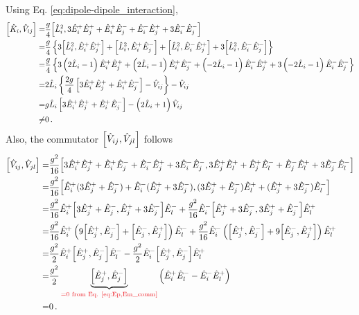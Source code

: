 \documentclass[a4paper,11pt]{article}
\newcommand{\oper}[1]{\hat{#1}}
\newcommand{\1}{{\oper{I}}}
\newcommand{\E}[2]{\oper{E}^{#1}_{#2}}
\renewcommand{\L}{\oper{L}}
\newcommand{\V}[1]{\oper{V}_{#1}}
\newcommand{\K}[1]{\oper{K}_{#1}}
\newcommand{\nn}{\nonumber \\}
\newcommand{\+}{\uparrow}
\renewcommand{\-}{\downarrow}
\newcommand{\0}{0}
\begin{document}
	\label{sec:comm_V_terms}
	Using Eq. \eqref{eq:dipole-dipole_interaction},
	\begin{align}
		\comm{\K{i}}{\V{ij}} =& \frac{g}{4}\comm{\L_i^2}{3\E{+}{i}\E{+}{j}+\E{+}{i}\E{-}{j}+\E{-}{i}\E{+}{j}+3\E{-}{i}\E{-}{j}} \nn
		=& \frac{g}{4}
		\left\{
		3\comm{\L_i^2}{\E{+}{i}\E{+}{j}}+\comm{\L_i^2}{\E{+}{i}\E{-}{j}}+\comm{\L_i^2}{\E{-}{i}\E{+}{j}}+3\comm{\L_i^2}{\E{-}{i}\E{-}{j}}
		\right\} \nn
		=&\frac{g}{4}
		\left\{
		3\left(2 \L_i - 1\right) \E{+}{i}\E{+}{j} + \left(2 \L_i - 1\right) \E{+}{i}\E{-}{j}+ \left(-2 \L_i - 1\right)\E{-}{i}\E{+}{j} +3\left(- 2 \L_i - 1\right) \E{-}{i}\E{-}{j}
		\right\} \nn
		=& 2 \L_i \left\{
		\frac{2g}{4} \left[3\E{+}{i}\E{+}{j}+\E{+}{i}\E{-}{j}\right] - \V{ij} \right\}- \V{ij}
		\nn
		=& g \L_i \left[3\E{+}{i}\E{+}{j}+\E{+}{i}\E{-}{j}\right] - \left(2 \L_i + 1\right) \V{ij}
		\nn
		\neq& 0 \,.
	\end{align}
	Also, the commutator $\comm{\V{ij}}{\V{jl}}$ follows
	\begin{align}
		\comm{\V{ij}}{\V{jl}} =& \frac{g^2}{16}\comm{3\E{+}{i}\E{+}{j}+\E{+}{i}\E{-}{j}+\E{-}{i}\E{+}{j}+3\E{-}{i}\E{-}{j}}{3\E{+}{j}\E{+}{l}+\E{+}{j}\E{-}{l}+\E{-}{j}\E{+}{l}+3\E{-}{j}\E{-}{l}} \nn
		=&\frac{g^2}{16}\comm{\E{+}{i}(3\E{+}{j}+\E{-}{j})+\E{-}{i}(\E{+}{j}+3\E{-}{j})}{(3\E{+}{j}+\E{-}{j})\E{+}{l}+(\E{+}{j}+3\E{-}{j})\E{-}{l}} \nn
		=&\frac{g^2}{16}\E{+}{i}\comm{3\E{+}{j}+\E{-}{j}}{\E{+}{j}+3\E{-}{j}}\E{-}{l} + \frac{g^2}{16}\E{-}{i}\comm{\E{+}{j}+3\E{-}{j}}{3\E{+}{j}+\E{-}{j}}\E{+}{l}
		\nn
		=&\frac{g^2}{16}\E{+}{i}\left( 9 \comm{\E{+}{j}}{\E{-}{j}} + \comm{\E{-}{j}}{\E{+}{j}}\right)\E{-}{l} + 
		\frac{g^2}{16}\E{-}{i}\left( \comm{\E{+}{j}}{\E{-}{j}} + 9 \comm{\E{-}{j}}{\E{+}{j}}\right)\E{+}{l}
		\nn
		=&\frac{g^2}{2}\E{+}{i}\comm{\E{+}{j}}{\E{-}{j}}\E{-}{l} - 
		\frac{g^2}{2}\E{-}{i}\comm{\E{+}{j}}{\E{-}{j}}\E{+}{l}
		\nn
		=&\frac{g^2}{2}\underbrace{\comm{\E{+}{j}}{\E{-}{j}}}_{\color{Red} =0 \text{ from Eq. \eqref{eq:Ep,Em_comm}}} \left(\E{+}{i}\E{-}{l} -\E{-}{i}\E{+}{l} \right)
		\nn
		=&0 \, .
	\end{align}
\end{document}
